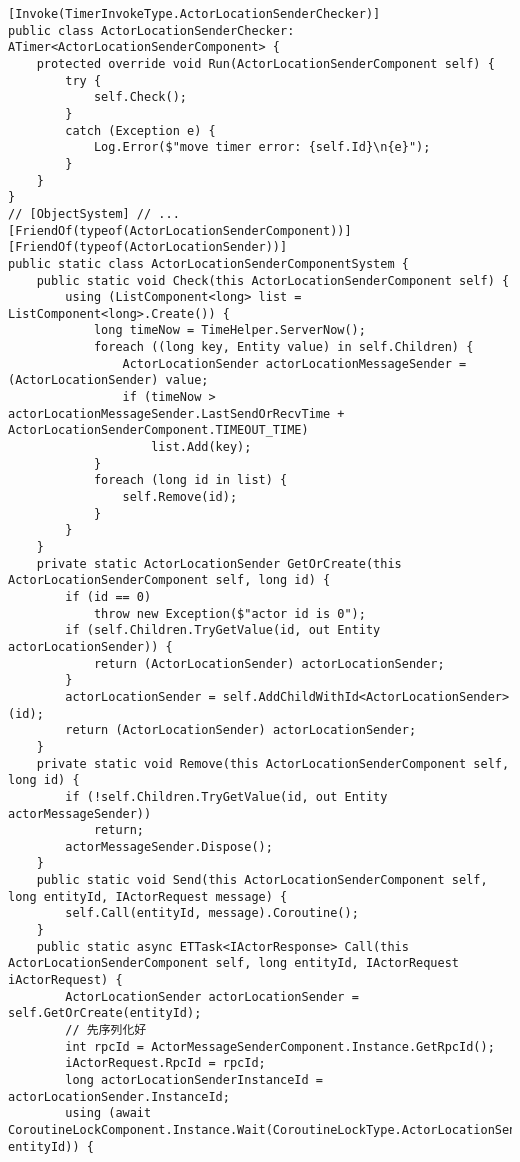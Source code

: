\documentclass[9pt, b5paper]{article}
\begin{document}
\begin{verbatim}
[Invoke(TimerInvokeType.ActorLocationSenderChecker)]
public class ActorLocationSenderChecker: ATimer<ActorLocationSenderComponent> {
    protected override void Run(ActorLocationSenderComponent self) {
        try {
            self.Check();
        }
        catch (Exception e) {
            Log.Error($"move timer error: {self.Id}\n{e}");
        }
    }
}
// [ObjectSystem] // ...
[FriendOf(typeof(ActorLocationSenderComponent))]
[FriendOf(typeof(ActorLocationSender))]
public static class ActorLocationSenderComponentSystem {
    public static void Check(this ActorLocationSenderComponent self) {
        using (ListComponent<long> list = ListComponent<long>.Create()) {
            long timeNow = TimeHelper.ServerNow();
            foreach ((long key, Entity value) in self.Children) {
                ActorLocationSender actorLocationMessageSender = (ActorLocationSender) value;
                if (timeNow > actorLocationMessageSender.LastSendOrRecvTime + ActorLocationSenderComponent.TIMEOUT_TIME) 
                    list.Add(key);
            }
            foreach (long id in list) {
                self.Remove(id);
            }
        }
    }
    private static ActorLocationSender GetOrCreate(this ActorLocationSenderComponent self, long id) {
        if (id == 0) 
            throw new Exception($"actor id is 0");
        if (self.Children.TryGetValue(id, out Entity actorLocationSender)) {
            return (ActorLocationSender) actorLocationSender;
        }
        actorLocationSender = self.AddChildWithId<ActorLocationSender>(id);
        return (ActorLocationSender) actorLocationSender;
    }
    private static void Remove(this ActorLocationSenderComponent self, long id) {
        if (!self.Children.TryGetValue(id, out Entity actorMessageSender)) 
            return;
        actorMessageSender.Dispose();
    }
    public static void Send(this ActorLocationSenderComponent self, long entityId, IActorRequest message) {
        self.Call(entityId, message).Coroutine();
    }
    public static async ETTask<IActorResponse> Call(this ActorLocationSenderComponent self, long entityId, IActorRequest iActorRequest) {
        ActorLocationSender actorLocationSender = self.GetOrCreate(entityId);
        // 先序列化好
        int rpcId = ActorMessageSenderComponent.Instance.GetRpcId();
        iActorRequest.RpcId = rpcId;
        long actorLocationSenderInstanceId = actorLocationSender.InstanceId;
        using (await CoroutineLockComponent.Instance.Wait(CoroutineLockType.ActorLocationSender, entityId)) {

\end{verbatim}
\end{document}
